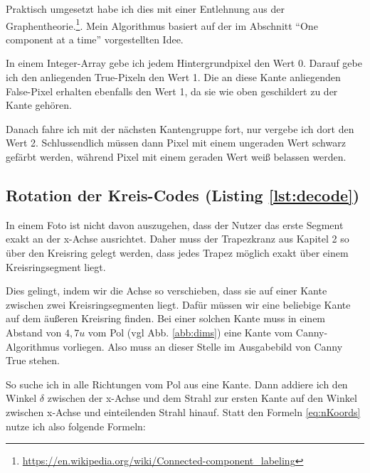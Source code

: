 Praktisch umgesetzt habe ich dies mit einer Entlehnung aus der Graphentheorie.\footnote{\url{https://en.wikipedia.org/wiki/Connected-component_labeling}}. Mein Algorithmus basiert auf der im Abschnitt "`One component at a time"' vorgestellten Idee.

In einem Integer-Array gebe ich jedem Hintergrundpixel den Wert 0. Darauf gebe ich den anliegenden True-Pixeln den Wert 1. Die an diese Kante anliegenden False-Pixel erhalten ebenfalls den Wert 1, da sie wie oben geschildert zu der Kante gehören.

Danach fahre ich mit der nächsten Kantengruppe fort, nur vergebe ich dort den Wert 2. Schlussendlich müssen dann Pixel mit einem ungeraden Wert schwarz gefärbt werden, während Pixel mit einem geraden Wert weiß belassen werden.

\subsection {Rotation der Kreis-Codes (Listing \ref{lst:decode})}
In einem Foto ist nicht davon auszugehen, dass der Nutzer das erste Segment exakt an der x-Achse ausrichtet. Daher muss der Trapezkranz aus Kapitel 2 so über den Kreisring gelegt werden, dass jedes Trapez möglich exakt über einem Kreisringsegment liegt. 

Dies gelingt, indem wir die Achse so verschieben, dass sie auf einer Kante zwischen zwei Kreisringsegmenten liegt. Dafür müssen wir eine beliebige Kante auf dem äußeren Kreisring finden. Bei einer solchen Kante muss in einem Abstand von \(4,7u\) vom Pol (vgl Abb. \ref{abb:dims}) eine Kante vom Canny-Algorithmus vorliegen. Also muss an dieser Stelle im Ausgabebild von Canny True stehen.

So suche ich in alle Richtungen vom Pol aus eine Kante.
Dann addiere ich den Winkel \(\delta\) zwischen der x-Achse und dem Strahl zur ersten Kante auf den Winkel zwischen x-Achse und einteilenden Strahl hinauf. Statt den Formeln \ref{eq:nKoords} nutze ich also folgende Formeln:

